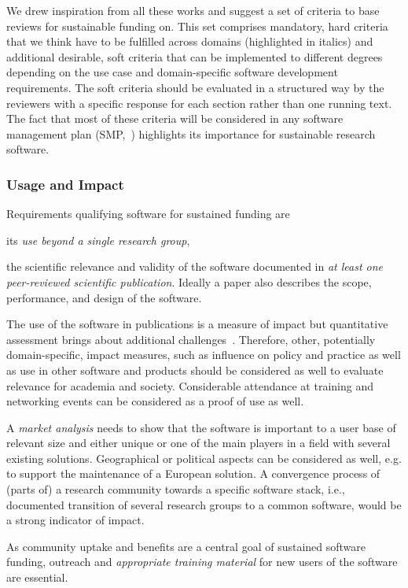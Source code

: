 \documentclass[a4paper,num-refs,numbers,sort&compress]{de-rse}
\begin{document}
We drew inspiration from all these works and suggest a set of criteria to base reviews for sustainable funding on. This set comprises mandatory, hard criteria that we think have to be fulfilled across domains (highlighted in italics) and additional desirable, soft criteria that can be implemented to different degrees depending on the use case and domain-specific software development requirements. The soft criteria should be evaluated in a structured way by the reviewers with a specific response for each section rather than one running text.
The fact that most of these criteria will be considered in any software management plan (SMP,~\cite{SSImanage}) highlights its importance for sustainable research software.

\subsubsection{Usage and Impact}
Requirements qualifying software for sustained funding are 
\begin{inlinelist}
    \item its \textit{use beyond a single research group}, 
    \item the scientific relevance and validity of the software documented in \textit{at least one peer-reviewed scientific publication}. Ideally a paper also describes the scope, performance, and design of the software.
    \item The use of the software in publications is a measure of impact but quantitative assessment brings about additional challenges~\cite{Li2019}. Therefore, other, potentially domain-specific, impact measures, such as influence on policy and practice as well as use in other software and products should be considered as well to evaluate relevance for academia and society. Considerable attendance at training and networking events can be considered as a proof of use as well.
    \item A \textit{market analysis} needs to show that the software is important to a user base of relevant size and either unique or one of the main players in a field with several existing solutions. Geographical or political aspects can be considered as well, e.g. to support the maintenance of a European solution. A convergence process of (parts of) a research community towards a specific software stack, i.e., documented transition of several research groups to a common software, would be a strong indicator of impact.
    \item As community uptake and benefits are a central goal of sustained software funding, outreach and \textit{appropriate training material} for new users of the software are essential.
\end{inlinelist}
\end{document}
